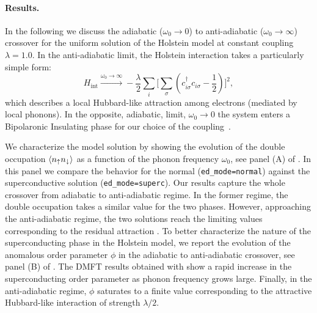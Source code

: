 \documentclass[edipack_sp.tex]{subfiles}
\begin{document}
\paragraph{Results.}
In the following we discuss the adiabatic ($\omega_0\to0$) to
anti-adiabatic ($\omega_0\to\infty$) crossover for
the uniform solution of the Holstein model at constant coupling $\lambda=1.0$.
%
In the anti-adiabatic limit, the Holstein interaction takes a
particularly simple form:
\begin{equation}\label{HlikeAttraction}
    H_\mathrm{int} \overset{ \omega_0 \rightarrow \infty}{ \longrightarrow } -\frac{\lambda}{2} \sum_i \Big[\sum_\sigma\left(c^\dagger_{i\sigma}c_{i\sigma} -\frac{1}{2}\right) \Big]^2,
\end{equation}
which describes a local Hubbard-like attraction among electrons
(mediated by local phonons).
In the opposite, adiabatic, limit, $\omega_0 \rightarrow 0$ the system
enters a Bipolaronic Insulating phase for our
choice of the coupling~\cite{Capone2006PRB}. 


We characterize the model solution by showing the evolution of the
double occupation $\langle n_{\uparrow}n_{\downarrow}\rangle$ as a function of the
phonon frequency $\omega_0$, see panel (A) of . In this panel we compare
the behavior for the normal  ({\tt ed\_mode=normal}) against the superconductive
solution ({\tt ed\_mode=superc}). Our results capture the whole
crossover from adiabatic to anti-adiabatic regime. In the former
regime, the double occupation takes a similar value for the two
phases. However, approaching the anti-adiabatic regime, the two
solutions reach the limiting values corresponding to the residual
attraction .   
To better characterize the nature of the superconducting
phase in the Holstein model, we report the evolution of the anomalous order
parameter $\phi$ in the adiabatic to anti-adiabatic crossover, see panel (B) of .
The DMFT results obtained with \NAME show a rapid increase in the
superconducting order parameter as phonon frequency grows
large. Finally, in the anti-adiabatic regime, $\phi$ saturates to a
finite value corresponding to the attractive Hubbard-like interaction
of strength $\lambda/2$. 
\end{document}
